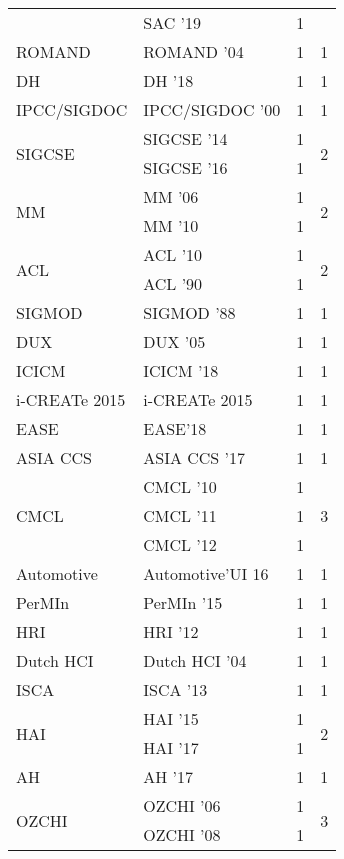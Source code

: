 \begin{table*}[t]
\begin{tabular}{llrr}
& SAC '19 & 1 &\\
\multirow{1}{*}{ROMAND } & ROMAND '04 & 1 & \multirow{1}{*}{1}\\
\multirow{1}{*}{DH } & DH '18 & 1 & \multirow{1}{*}{1}\\
\multirow{1}{*}{IPCC/SIGDOC } & IPCC/SIGDOC '00 & 1 & \multirow{1}{*}{1}\\
\multirow{2}{*}{SIGCSE } & SIGCSE '14 & 1 & \multirow{2}{*}{2}\\
& SIGCSE '16 & 1 &\\
\multirow{2}{*}{MM } & MM '06 & 1 & \multirow{2}{*}{2}\\
& MM '10 & 1 &\\
\multirow{2}{*}{ACL } & ACL '10 & 1 & \multirow{2}{*}{2}\\
& ACL '90 & 1 &\\
\multirow{1}{*}{SIGMOD } & SIGMOD '88 & 1 & \multirow{1}{*}{1}\\
\multirow{1}{*}{DUX } & DUX '05 & 1 & \multirow{1}{*}{1}\\
\multirow{1}{*}{ICICM } & ICICM '18 & 1 & \multirow{1}{*}{1}\\
\multirow{1}{*}{i-CREATe 2015} & i-CREATe 2015 & 1 & \multirow{1}{*}{1}\\
\multirow{1}{*}{EASE} & EASE'18 & 1 & \multirow{1}{*}{1}\\
\multirow{1}{*}{ASIA CCS } & ASIA CCS '17 & 1 & \multirow{1}{*}{1}\\
\multirow{3}{*}{CMCL } & CMCL '10 & 1 & \multirow{3}{*}{3}\\
& CMCL '11 & 1 &\\
& CMCL '12 & 1 &\\
\multirow{1}{*}{Automotive} & Automotive'UI 16 & 1 & \multirow{1}{*}{1}\\
\multirow{1}{*}{PerMIn } & PerMIn '15 & 1 & \multirow{1}{*}{1}\\
\multirow{1}{*}{HRI } & HRI '12 & 1 & \multirow{1}{*}{1}\\
\multirow{1}{*}{Dutch HCI } & Dutch HCI '04 & 1 & \multirow{1}{*}{1}\\
\multirow{1}{*}{ISCA } & ISCA '13 & 1 & \multirow{1}{*}{1}\\
\multirow{2}{*}{HAI } & HAI '15 & 1 & \multirow{2}{*}{2}\\
& HAI '17 & 1 &\\
\multirow{1}{*}{AH } & AH '17 & 1 & \multirow{1}{*}{1}\\
\multirow{3}{*}{OZCHI } & OZCHI '06 & 1 & \multirow{3}{*}{3}\\
& OZCHI '08 & 1 &\\

\end{tabular}
\end{table*}
